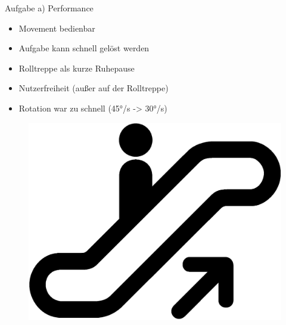 \documentclass{beamer}
\begin{document}
\begin{frame}{Aufgabe a) Performance}
\begin{minipage}[c]{0.72\textwidth}
\begin{itemize}
\item Movement bedienbar
\item Aufgabe kann schnell gelöst werden
\item Rolltreppe als kurze Ruhepause
\item Nutzerfreiheit (außer auf der Rolltreppe)
\item Rotation war zu schnell (45°/s -> 30°/s)
\end{itemize}
\end{minipage}
\hfill
\begin{minipage}[c]{0.25\textwidth}
\begin{figure}
\centering
\includegraphics[width=\textwidth, keepaspectratio]{img/escalatorup}
\caption{\cite{esc}}
\end{figure}
\end{minipage}
\end{frame}
\end{document}

